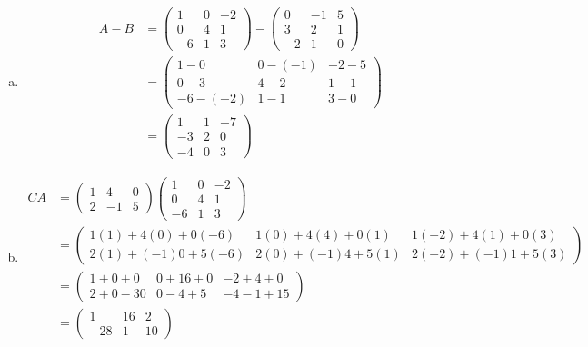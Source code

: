 \documentclass[12pt,letterpaper]{exam}
\begin{document}
\begin{questions}
\begin{enumerate}[(a)]
\item 
	\[
	\begin{aligned}
	A - B&= 
	\begin{pmatrix}
	1 & 0 & -2 \\
	0 & 4 & 1 \\
	-6 & 1 & 3
	\end{pmatrix} - 	
	\begin{pmatrix}
	0 & -1 & 5 \\
	3 & 2 & 1 \\
	-2 & 1 & 0 
	\end{pmatrix} \\[0.3cm]
	&= 
	\begin{pmatrix}
	1 - 0 & 0 - (-1) & -2 - 5 \\
	0 - 3 & 4 - 2 & 1 - 1 \\
	-6 - (-2) & 1 - 1 & 3 - 0 
	\end{pmatrix} \\[0.3cm]
	&= 
	\begin{pmatrix}
	1 & 1 & -7 \\
	-3 & 2 & 0 \\
	-4 & 0 & 3
	\end{pmatrix} 
	\end{aligned}
	\]

\item 
	\[
	\begin{aligned}
	CA&= 
	\begin{pmatrix}
	1 & 4 & 0 \\
	2 & -1 & 5 
	\end{pmatrix}
	\begin{pmatrix}
	1 & 0 & -2 \\
	0 & 4 & 1 \\
	-6 & 1 & 3
	\end{pmatrix} \\[0.3cm]
	&= \begin{pmatrix}
	1(1) + 4(0) + 0(-6) & 1(0) + 4(4) + 0(1) & 1(-2) + 4(1) + 0(3) \\
	2(1) + (-1)0 + 5(-6) & 2(0) + (-1)4 + 5(1) & 2(-2) + (-1)1 + 5(3) 
	\end{pmatrix} \\[0.3cm]
	&= \begin{pmatrix}
	1 + 0 + 0 & 0 + 16 + 0 & -2 + 4 + 0 \\
	2 + 0 - 30 & 0 - 4 + 5 & -4 - 1 + 15 
	\end{pmatrix} \\[0.3cm]
	&= \begin{pmatrix}
	1 & 16 & 2 \\
	-28 & 1 & 10 
	\end{pmatrix}
	\end{aligned}
	\]
\end{enumerate}




\end{questions}
\end{document}
